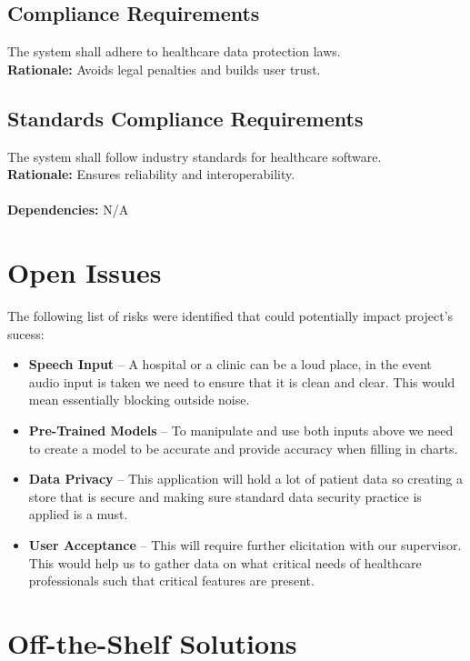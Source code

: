 \documentclass[12pt]{article}
\begin{document}
\subsection{Compliance Requirements}
The system shall adhere to healthcare data protection laws.  \\
\textbf{Rationale:} Avoids legal penalties and builds user trust.

\subsection{Standards Compliance Requirements}
The system shall follow industry standards for healthcare software.  \\
\textbf{Rationale:} Ensures reliability and interoperability. \\
  \\
\textbf{Dependencies:} N/A

\section{Open Issues}

The following list of risks were identified that could potentially impact project's sucess:
\begin{itemize}
  \item \textbf{Speech Input} -- A hospital or a clinic can be a loud place, in the event audio input is taken we need to ensure that it is clean and clear. This would mean essentially blocking outside noise. 
  \item \textbf{Pre-Trained Models} -- To manipulate and use both inputs above we need to create a model to be accurate and provide accuracy when filling in charts. 
  \item \textbf{Data Privacy} -- This application will hold a lot of patient data so creating a store that is secure and making sure standard data security practice is applied is a must.
  \item \textbf{User Acceptance} -- This will require further elicitation with our supervisor. This would help us to gather data on what critical needs of healthcare professionals such that critical features are present. 
\end{itemize}

\section{Off-the-Shelf Solutions}
\end{document}
